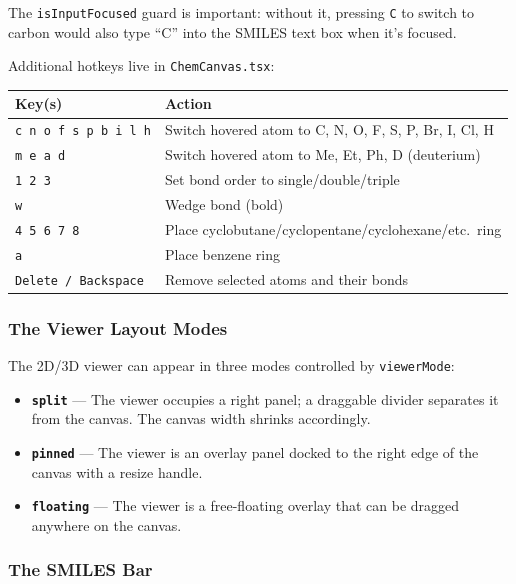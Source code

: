 \documentclass[11pt,a4paper]{article}
\begin{document}
The \lstinline|isInputFocused| guard is important: without it, pressing \texttt{C} to
switch to carbon would also type ``C'' into the SMILES text box when it's focused.

Additional hotkeys live in \lstinline|ChemCanvas.tsx|:

\begin{tabularx}{\linewidth}{@{} l X @{}}
\toprule
\textbf{Key(s)} & \textbf{Action} \\
\midrule
\texttt{c n o f s p b i l h} & Switch hovered atom to C, N, O, F, S, P, Br, I, Cl, H \\
\texttt{m e a d} & Switch hovered atom to Me, Et, Ph, D (deuterium) \\
\texttt{1 2 3} & Set bond order to single/double/triple \\
\texttt{w} & Wedge bond (bold) \\
\texttt{4 5 6 7 8} & Place cyclobutane/cyclopentane/cyclohexane/etc.\ ring \\
\texttt{a} & Place benzene ring \\
\texttt{Delete / Backspace} & Remove selected atoms and their bonds \\
\bottomrule
\end{tabularx}

\subsubsection{The Viewer Layout Modes}

The 2D/3D viewer can appear in three modes controlled by \lstinline|viewerMode|:

\begin{itemize}[leftmargin=1.5em]
  \item \textbf{\lstinline|split|} --- The viewer occupies a right panel; a draggable
        divider separates it from the canvas. The canvas width shrinks accordingly.
  \item \textbf{\lstinline|pinned|} --- The viewer is an overlay panel docked to the
        right edge of the canvas with a resize handle.
  \item \textbf{\lstinline|floating|} --- The viewer is a free-floating overlay that
        can be dragged anywhere on the canvas.
\end{itemize}

\subsubsection{The SMILES Bar}
\end{document}
